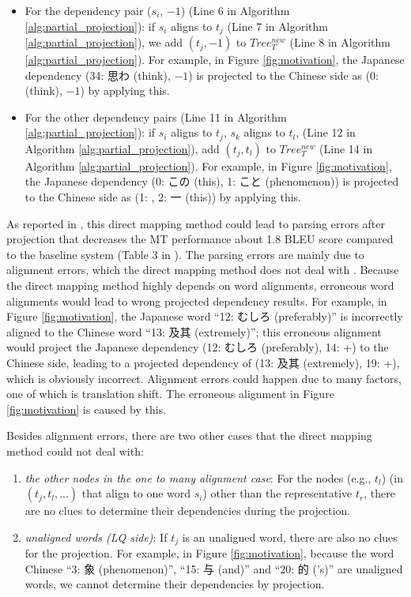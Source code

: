 \documentclass[english]{jnlp_1.4}
\begin{document}
\begin{itemize}
\item
{For the dependency pair ($s_i$, $-1$)
(Line {6} in Algorithm \ref{alg:partial_projection}): if $s_i$ aligns to $t_j$
(Line {7} in Algorithm \ref{alg:partial_projection}),
we add $(t_j,-1)$ to $Tree_T^{new}$ (Line {8} in Algorithm \ref{alg:partial_projection}). 
For example, in Figure \ref{fig:motivation},
the Japanese dependency (34: 思わ (think), $-1$) is projected to the Chinese side as
(0:  (think), $-1$) by applying this.}
\item
{For the other dependency pairs (Line {11} in Algorithm \ref{alg:partial_projection}):} 
if $s_i$ aligns to $t_j$, $s_k$ aligns to $t_l$, 
{(Line {12} in Algorithm \ref{alg:partial_projection})}, 
add $(t_j,t_l)$ to $Tree_T^{new}$ {(Line {14} in Algorithm \ref{alg:partial_projection})}. 
For example, in Figure \ref{fig:motivation},
the Japanese dependency (0: この (this), 1: こと (phenomenon)) is projected to the Chinese side as
(1: , 2: 一 (this)) by applying this.
\end{itemize}

As reported in \cite{Shen2015a}, this direct mapping method could lead to parsing 
errors after projection that decreases the MT performance about 1.8 BLEU score compared 
to the baseline system (Table 3 in \cite{Shen2015a}). {The parsing 
errors are mainly due to alignment errors, which the direct mapping method does not 
deal with \cite{Shen2015a}. Because the direct mapping method highly depends on word alignments, erroneous word alignments
would lead to wrong projected dependency results. For example, in Figure \ref{fig:motivation},
the Japanese word ``12: むしろ (preferably)'' is incorrectly aligned to the Chinese word ``13: 及其 (extremely)'';
this erroneous alignment would project the Japanese dependency (12: むしろ (preferably), 14: +) to the Chinese side, 
leading to a projected dependency of (13: 及其 (extremely), 19: +), which is obviously incorrect.
Alignment errors could happen due to many factors, one of which is translation shift.
The erroneous alignment in Figure \ref{fig:motivation} is caused by this.}

{Besides alignment errors, there are two other cases} that the direct mapping method could not deal with:

\begin{enumerate}
\item
{\it the other nodes in the one to many alignment case}: For the nodes (e.g., $t_l$) (in $(t_j,t_l,...)$
that align to one word $s_i$) other than the representative $t_r$, there are no clues to determine
their dependencies during the projection.
\item
{\it unaligned words (LQ side)}: If $t_j$ is an unaligned word, there are also no clues for 
the projection. For example, in Figure \ref{fig:motivation}, because the word Chinese ``3: 象 (phenomenon)'', 
``15: 与 (and)'' and ``20: 的 ('s)'' are unaligned words, we cannot determine their dependencies by
projection.
\end{enumerate}
\end{document}
